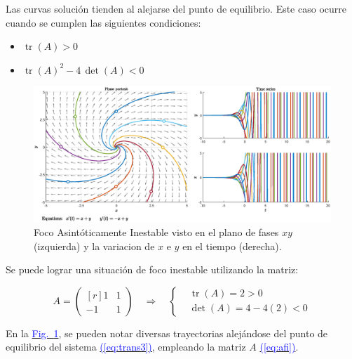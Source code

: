 \documentclass[12pt,a4paper]{report} %
\newcommand{\fref}[1]{\hyperref[#1]{\textcolor{blue}{Fig.~\ref*{#1}}}}
\newcommand{\eref}[1]{\hyperref[#1]{\textcolor{blue}{(\ref*{#1})}}}
\newcommand{\fref}[1]{\hyperref[#1]{\textcolor{blue}{\textit{Fig.~\ref*{#1}}}}}
\newcommand{\eref}[1]{\hyperref[#1]{\textcolor{blue}{\textit{(\ref*{#1})}}}}
\newcommand{\tr}{\operatorname{\textrm{tr}}}
\begin{document}
	\newpage
	
	\vspace{1cm}
	
	\vspace{0.3cm}\noindent Las curvas solución tienden al alejarse del punto de equilibrio. Este caso ocurre cuando se cumplen las siguientes condiciones: 
	\begin{itemize}
		\item $\tr(A)>0$
		\item $\tr(A)^2-4\, \det(A)<0$
	\end{itemize}
	
	\begin{figure}[h]
		\centering
		\includegraphics[width=1\textwidth]{inestable.eps}
		\caption{Foco Asintóticamente Inestable visto en el plano de fases $xy$ (izquierda) y la variacion de $x$ e $y$ en el tiempo (derecha).}
		\label{fig:inestable}
	\end{figure}\smallskip
	
	\vspace{0.3cm}\noindent Se puede lograr una situación de foco inestable utilizando la matriz:
	
	\begin{equation}
		\label{eq:afi}
		A=\begin{pmatrix*}[r]
			1 & 1 \\
			-1 & 1
		\end{pmatrix*} \quad \Longrightarrow \quad 
		\left\{ 
		\begin{aligned}
			&\tr(A)=2>0 \\[2mm]
			&\det(A)=4-4(2)<0
		\end{aligned}
		\right.
	\end{equation}\smallskip
	
	\vspace{0.5cm}\noindent En la \fref{fig:inestable}, se pueden notar diversas trayectorias alejándose del punto de equilibrio del sistema \eref{eq:trans3}, empleando la matriz $A$ \eref{eq:afi}.
	
\end{document}
